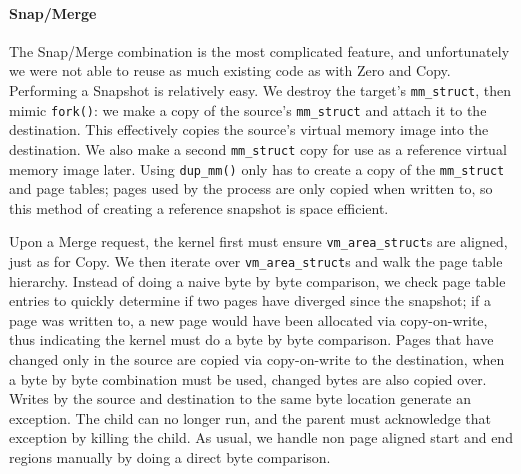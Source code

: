 \begin{itemize}

\paragraph{Snap/Merge}
The Snap/Merge combination is the most complicated feature, and unfortunately we
were not able to reuse as much existing code as with Zero and Copy. Performing
a Snapshot is relatively easy. We destroy the target's {\tt mm\_struct}, then
mimic {\tt fork()}: we make a copy of the source's {\tt mm\_struct} and attach
it to the destination. This effectively copies the source's virtual memory image
into the destination. We also make a second {\tt mm\_struct} copy for use as a
reference virtual memory image later. Using {\tt dup\_mm()} only has to create
a copy of the {\tt mm\_struct} and page tables; pages used by the process are
only copied when written to, so this method of creating a reference snapshot is
space efficient.

Upon a Merge request, the kernel first must ensure {\tt vm\_area\_struct}s are
aligned, just as for Copy. We then iterate over {\tt vm\_area\_struct}s and walk
the page table hierarchy. Instead of doing a naive byte by byte comparison, we
check page table entries to quickly determine if
two pages have diverged since the snapshot; if a page was written to, a new page
would have been allocated via copy-on-write, thus indicating the kernel must do
a byte by byte comparison. Pages that have changed only in the source are copied
via copy-on-write to the destination, when a byte by byte combination must be
used, changed bytes are also copied over. Writes by the source and destination
to the same byte location generate an exception. The child can no longer run,
and the parent must acknowledge that exception by killing the child. As usual,
we handle non page aligned start and end regions manually by doing a direct
byte comparison.


\end{itemize}
